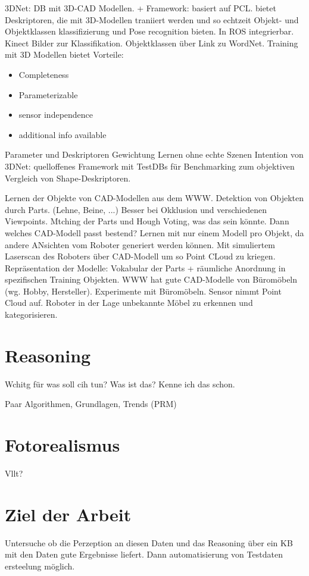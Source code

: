 \cite{3dnet} \newline
3DNet: DB mit 3D-CAD Modellen. + Framework: basiert auf PCL. bietet Deskriptoren, die mit 3D-Modellen traniiert werden und so echtzeit Objekt- und Objektklassen klassifizierung und Pose recognition bieten. In ROS integrierbar. Kinect Bilder zur Klassifikation. \newline
Objektklassen über Link zu WordNet. \newline 
Training mit 3D Modellen bietet Vorteile: 
\begin{itemize}
	\item Completeness
	\item Parameterizable
	\item sensor independence
	\item additional info available
\end{itemize}
Parameter und Deskriptoren Gewichtung Lernen ohne echte Szenen \newline
Intention von 3DNet: quelloffenes Framework mit TestDBs für Benchmarking zum objektiven Vergleich von Shape-Deskriptoren. \par


\citep{modelsWWW}
Lernen der Objekte von CAD-Modellen aus dem WWW. \newline
Detektion von Objekten durch Parts. (Lehne, Beine, ...) Besser bei Okklusion und verschiedenen Viewpoints. Mtching der Parts und Hough Voting, was das sein könnte. Dann welches CAD-Modell passt bestend? \newline
Lernen mit nur einem Modell pro Objekt, da andere ANsichten vom Roboter generiert werden können. Mit simuliertem Laserscan des Roboters über CAD-Modell um so Point CLoud zu kriegen.\newline
Repräsentation der Modelle: Vokabular der Parts + räumliche Anordnung in spezifischen Training Objekten. \newline
WWW hat gute CAD-Modelle von Büromöbeln (wg. Hobby, Hersteller). Experimente mit Büromöbeln. Sensor nimmt Point Cloud auf. \newline
Roboter in der Lage unbekannte Möbel zu erkennen und kategorisieren. \par


\section{Reasoning}

Wchitg für was soll cih tun? Was ist das? Kenne ich das schon.

Paar Algorithmen, Grundlagen, Trends (PRM) 

\section{Fotorealismus}

Vllt?

\section{Ziel der Arbeit}
\label{sec:goal}

Untersuche ob die Perzeption an diesen Daten und das Reasoning über ein KB mit den Daten gute Ergebnisse liefert. Dann automatisierung von Testdaten ersteelung möglich. 